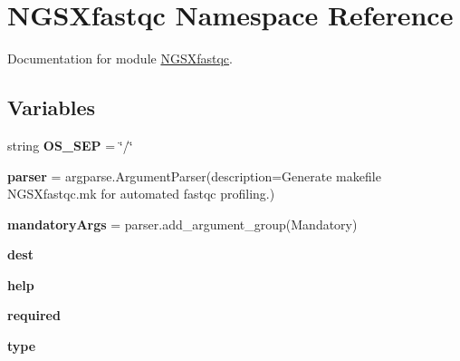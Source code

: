 \hypertarget{namespaceNGSXfastqc}{}\section{N\+G\+S\+Xfastqc Namespace Reference}
\label{namespaceNGSXfastqc}


Documentation for module \hyperlink{namespaceNGSXfastqc}{N\+G\+S\+Xfastqc}.  


\subsection*{Variables}
\begin{DoxyCompactItemize}
\item 
string {\bfseries O\+S\+\_\+\+S\+EP} = \char`\"{}/\char`\"{}\hypertarget{namespaceNGSXfastqc_a8174a094ff9d202cee0bfcde75d779f9}{}\label{namespaceNGSXfastqc_a8174a094ff9d202cee0bfcde75d779f9}

\item 
{\bfseries parser} = argparse.\+Argument\+Parser(description=\textquotesingle{}Generate makefile N\+G\+S\+Xfastqc.\+mk for automated fastqc profiling.\textquotesingle{})\hypertarget{namespaceNGSXfastqc_aae39211c63a434b48da85aa58966bd23}{}\label{namespaceNGSXfastqc_aae39211c63a434b48da85aa58966bd23}

\item 
{\bfseries mandatory\+Args} = parser.\+add\+\_\+argument\+\_\+group(\textquotesingle{}Mandatory\textquotesingle{})\hypertarget{namespaceNGSXfastqc_a977e8e88c856adea1cb611eb292109f4}{}\label{namespaceNGSXfastqc_a977e8e88c856adea1cb611eb292109f4}

\item 
{\bfseries dest}\hypertarget{namespaceNGSXfastqc_afded4daefbdde94d35106eb5732d6424}{}\label{namespaceNGSXfastqc_afded4daefbdde94d35106eb5732d6424}

\item 
{\bfseries help}\hypertarget{namespaceNGSXfastqc_a1e589baf14422bb4b49901a8b8aabe81}{}\label{namespaceNGSXfastqc_a1e589baf14422bb4b49901a8b8aabe81}

\item 
{\bfseries required}\hypertarget{namespaceNGSXfastqc_a9517ed5dcad129fd5c9e93a067e8ed1d}{}\label{namespaceNGSXfastqc_a9517ed5dcad129fd5c9e93a067e8ed1d}

\item 
{\bfseries type}\hypertarget{namespaceNGSXfastqc_a11d09abbd46239cb84332fb9c2046f5b}{}\label{namespaceNGSXfastqc_a11d09abbd46239cb84332fb9c2046f5b}


\end{DoxyCompactItemize}
